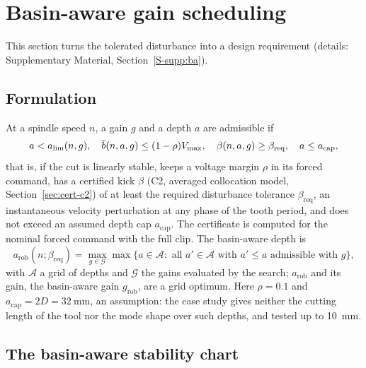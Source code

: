 \section{Basin-aware gain scheduling}\label{sec:basin-aware}

This section turns the tolerated disturbance into a design requirement (details: Supplementary Material, Section~\ref{S-supp:ba}).

\subsection{Formulation}\label{sec:ba-form}

At a spindle speed $n$, a gain $g$ and a depth $a$ are admissible if
\begin{equation}\label{eq:admissible}
  a<a_{\lim}(n,g),\quad \bar b(n,a,g)\le(1-\rho)V_{\max},\quad \beta(n,a,g)\ge\beta_{\mathrm{req}},\quad a\le a_{\mathrm{cap}},
\end{equation}
that is, if the cut is linearly stable, keeps a voltage margin $\rho$ in its forced command, has a certified kick $\beta$ (C2, averaged collocation model, Section~\ref{sec:cert-c2}) of at least the required disturbance tolerance $\beta_{\mathrm{req}}$, an instantaneous velocity perturbation at any phase of the tooth period, and does not exceed an assumed depth cap $a_{\mathrm{cap}}$. The certificate is computed for the nominal forced command with the full clip. The basin-aware depth is
\begin{equation}\label{eq:arob}
  a_{\mathrm{rob}}(n;\beta_{\mathrm{req}})=\max_{g\in\mathcal G}\max\bigl\{a\in\mathcal A:\text{ all }a'\in\mathcal A\text{ with }a'\le a\text{ admissible with }g\bigr\},
\end{equation}
with $\mathcal A$ a grid of depths and $\mathcal G$ the gains evaluated by the search; $a_{\mathrm{rob}}$ and its gain, the basin-aware gain $g_{\mathrm{rob}}$, are a grid optimum. Here $\rho=0.1$ and $a_{\mathrm{cap}}=2D=\SI{32}{\milli\metre}$, an assumption: the case study gives neither the cutting length of the tool nor the mode shape over such depths, and tested up to \SI{10}{\milli\metre}.

\subsection{The basin-aware stability chart}\label{sec:ba-res}

